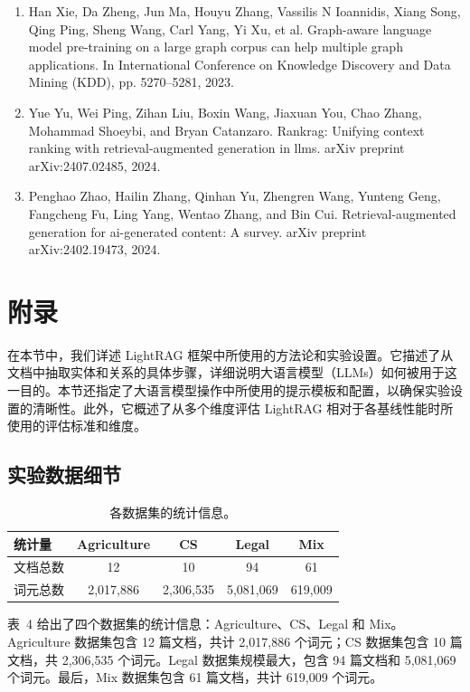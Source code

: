 \documentclass[11pt,UTF8,fontset=fandol]{ctexart}
\begin{document}
\begin{enumerate}[leftmargin=2em]
\item Han Xie, Da Zheng, Jun Ma, Houyu Zhang, Vassilis N Ioannidis, Xiang Song, Qing Ping, Sheng Wang, Carl Yang, Yi Xu, et al. Graph-aware language model pre-training on a large graph corpus can help multiple graph applications. In International Conference on Knowledge Discovery and Data Mining (KDD), pp. 5270--5281, 2023.
\item Yue Yu, Wei Ping, Zihan Liu, Boxin Wang, Jiaxuan You, Chao Zhang, Mohammad Shoeybi, and Bryan Catanzaro. Rankrag: Unifying context ranking with retrieval-augmented generation in llms. arXiv preprint arXiv:2407.02485, 2024.
\item Penghao Zhao, Hailin Zhang, Qinhan Yu, Zhengren Wang, Yunteng Geng, Fangcheng Fu, Ling Yang, Wentao Zhang, and Bin Cui. Retrieval-augmented generation for ai-generated content: A survey. arXiv preprint arXiv:2402.19473, 2024.
\end{enumerate}

\section{附录}

在本节中，我们详述 LightRAG 框架中所使用的方法论和实验设置。它描述了从文档中抽取实体和关系的具体步骤，详细说明大语言模型（LLMs）如何被用于这一目的。本节还指定了大语言模型操作中所使用的提示模板和配置，以确保实验设置的清晰性。此外，它概述了从多个维度评估 LightRAG 相对于各基线性能时所使用的评估标准和维度。

\subsection{实验数据细节}

\begin{table}[H]\centering
\caption{各数据集的统计信息。}
\label{tab:4}
\begin{tabular}{lcccc}
\toprule
统计量 & Agriculture & CS & Legal & Mix \\
\midrule
文档总数 & 12 & 10 & 94 & 61 \\
词元总数 & 2{,}017{,}886 & 2{,}306{,}535 & 5{,}081{,}069 & 619{,}009 \\
\bottomrule
\end{tabular}
\end{table}

表~4 给出了四个数据集的统计信息：Agriculture、CS、Legal 和 Mix。Agriculture 数据集包含 12 篇文档，共计 2{,}017{,}886 个词元；CS 数据集包含 10 篇文档，共 2{,}306{,}535 个词元。Legal 数据集规模最大，包含 94 篇文档和 5{,}081{,}069 个词元。最后，Mix 数据集包含 61 篇文档，共计 619{,}009 个词元。
\end{document}
